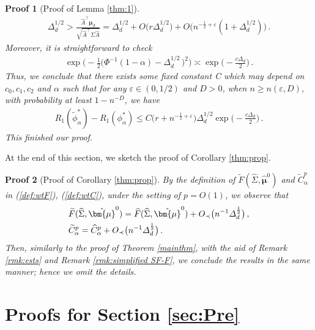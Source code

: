 \documentclass[12pt]{article}
\numberwithin{equation}{section}
\newtheorem{myPro}{Proof}
\theoremstyle{remark}
\newcommand{\1}{{\rm 1}\kern-0.24em{\rm I}}
\begin{document}
\begin{appendices}
\begin{myPro}[Proof of Lemma \ref{thm:1}]
\begin{align*}
 \varDelta_d^{1/2}>\frac{\widehat A^{\top} {\bm{\mu}}_d}{\sqrt{\widehat A^{\top} \Sigma \widehat A}} =  \varDelta_d^{1/2}+ O\big( r \varDelta_d^{1/2} \big) + O\big(n^{-\frac 12 +\varepsilon} (1+  \varDelta_d^{1/2})\big)\,.
\end{align*}
Moreover, it is straightforward to check
\begin{align*}
 \exp\Big(-\frac12 {\Big(\Phi^{-1}(1-\alpha) -  \varDelta_d^{1/2}\, \Big)^2}\Big) \asymp\exp\Big(- \frac{c \varDelta_d}{2}\Big)\,.
\end{align*}
Thus, we conclude that there exists some fixed constant C which may depend on $c_0, c_1, c_2$ and $\alpha$ such that for any $\varepsilon \in (0, 1/2)$ and $D>0$, when $n\geq n(\varepsilon, D)$, with probability at least $1- n^{-D}$, we have
\begin{align*}
R_1(\tilde \phi_\alpha^*)- R_1({\phi}_\alpha^*) \leq  C \big(  r + n^{-\frac 12 +\varepsilon}  \big) \varDelta_d^{1/2} \exp\Big(- \frac{c\varDelta_d}{2}\Big)\, .
\end{align*}
This finished our proof. 
\end{myPro}

At the end of this section, we sketch the proof of Corollary \ref{thm:prop}.  %

\begin{myPro} [Proof of Corollary \ref{thm:prop}]
By the definition of $\widetilde{F}(\widehat\Sigma, \hat{\bm{\mu}}^0)$ and $ \widetilde C_\alpha^p$ in  (\ref{def:wtF}), (\ref{def:wtC}), under the setting of $p= O(1)$, we observe that 
\begin{align*}
&\widetilde{F}(\widehat\Sigma, \hat{\bm{\mu}}^0) = \widehat{F}(\widehat\Sigma, \hat{\bm{\mu}}^0) + O_\prec \big(n^{-1} \varDelta_d^{\frac 12} \big)\,,\notag\\
&\widetilde C_\alpha^p=  \widehat C_\alpha^p + O_\prec \big(n^{-1} \varDelta_d^{\frac 12}\big)\,.
\end{align*} 
Then, similarly to the proof of Theorem \ref{mainthm}, with the aid of Remark \ref{rmk:ests} and Remark \ref{rmk:simplified SF-F}, we conclude the results in the same manner; hence we omit the details.

\end{myPro}




\section{Proofs for Section \ref{sec:Pre}} \label{sec:appen_pf_tech}




\end{appendices}
\end{document}
